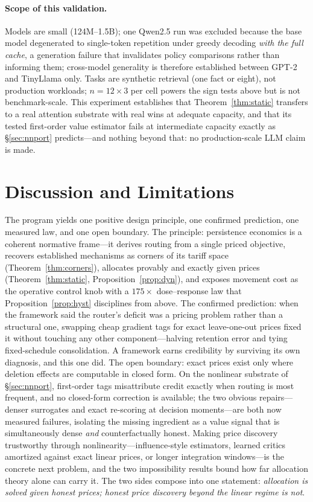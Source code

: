 \documentclass[10pt,twocolumn]{article}
\theoremstyle{definition}
\begin{document}
\paragraph{Scope of this validation.}
Models are small (124{M}--1.5{B}); one {Qwen2.5} run was excluded because the base model degenerated to
single-token repetition under greedy decoding \emph{with the full cache}, a generation failure that
invalidates policy comparisons rather than informing them; cross-model generality is therefore established
between {GPT-2} and {TinyLlama} only. Tasks are synthetic retrieval (one fact or eight), not production
workloads; $n{=}12{\times}3$ per cell powers the sign tests above but is not benchmark-scale. This
experiment establishes that Theorem~\ref{thm:static} transfers to a real attention substrate with real
wins at adequate capacity, and that its tested first-order value estimator fails at intermediate capacity
exactly as \S\ref{sec:nnport} predicts---and nothing beyond that: no production-scale {LLM} claim is made.

\section{Discussion and Limitations}\label{sec:discussion}

The program yields one positive design principle, one confirmed prediction, one measured law, and one open
boundary. The principle: persistence economics is a coherent normative frame---it derives routing from a
single priced objective, recovers established mechanisms as corners of its tariff space
(Theorem~\ref{thm:corners}), allocates provably and exactly given prices (Theorem~\ref{thm:static},
Proposition~\ref{prop:dyn}), and exposes movement cost as the operative control knob with a $175\times$
dose--response law that Proposition~\ref{prop:hyst} disciplines from above. The confirmed prediction: when
the framework said the router's deficit was a pricing problem rather than a structural one, swapping cheap
gradient tags for exact leave-one-out prices fixed it without touching any other component---halving
retention error and tying fixed-schedule consolidation. A framework earns credibility by surviving its own
diagnosis, and this one did. The open boundary: exact prices exist only where deletion effects are computable
in closed form. On the nonlinear substrate of \S\ref{sec:nnport}, first-order tags misattribute credit exactly
when routing is most frequent, and no closed-form correction is available; the two obvious repairs---denser
surrogates and exact re-scoring at decision moments---are both now measured failures, isolating the missing
ingredient as a value signal that is simultaneously dense \emph{and} counterfactually honest. Making price
discovery trustworthy through nonlinearity---influence-style estimators, learned critics amortized
against exact linear prices, or longer integration windows---is the concrete next problem, and the two
impossibility results bound how far allocation theory alone can carry it. The two sides compose into one
statement: \emph{allocation is solved given honest prices; honest price discovery beyond the linear regime
is not}.
\end{document}
